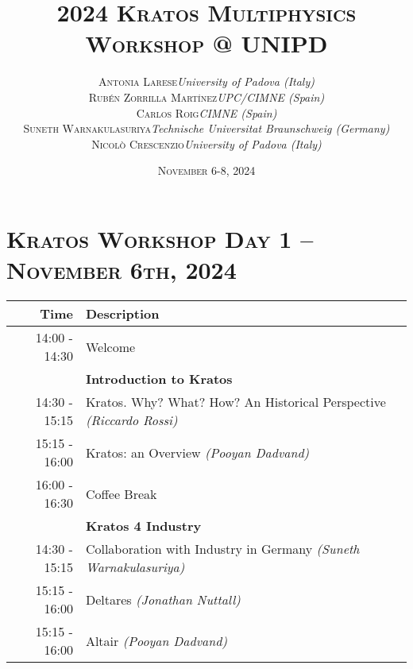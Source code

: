 \documentclass{article}
\begin{document}
\title{
   \Huge
   2024 \textsc{Kratos Multiphysics\\Workshop @ UNIPD}
}
\author{
   \small
   \begin{tabular}{rl}
      \textsc{Antonia Larese} & \textit{University of Padova (Italy)} \\
      \textsc{Rubén Zorrilla Martínez} & \textit{UPC/CIMNE (Spain)} \\
      \textsc{Carlos Roig} & \textit{CIMNE (Spain)} \\
      \textsc{Suneth Warnakulasuriya} & \textit{Technische Universitat Braunschweig (Germany)} \\
      \textsc{Nicol\`o Crescenzio} & \textit{University of Padova (Italy)}
   \end{tabular}
}
\date{\textsc{November} 6-8, 2024}
\maketitle

\section*{\centering\textsc{Kratos Workshop Day 1 -- November 6th, 2024}}

\begin{table}[h]\centering
   \begin{tabularx}{0.85\textwidth}{r|X}
      \toprule\rule{0mm}{5mm}
      {\large Time} & {\large Description} \\[1ex]
      \midrule\rule{0mm}{5mm}
      14:00 - 14:30 & Welcome \\[1ex]
      \midrule\rule{0mm}{5mm}
                    & {\large \textbf{Introduction to Kratos}} \\[1ex]
      14:30 - 15:15 & Kratos. Why? What? How? An Historical Perspective \textit{(Riccardo Rossi)}\\[1ex]
      15:15 - 16:00 & Kratos: an Overview \textit{(Pooyan Dadvand)}\\[1ex]
      \midrule\rule{0mm}{5mm}
      16:00 - 16:30 & Coffee Break \\[1ex]
      \midrule\rule{0mm}{5mm}
                    & {\large \textbf{Kratos 4 Industry}} \\[1ex]
      14:30 - 15:15 & Collaboration with Industry in Germany \textit{(Suneth Warnakulasuriya)}\\[1ex]
      15:15 - 16:00 & Deltares \textit{(Jonathan Nuttall)}\\[1ex]
      15:15 - 16:00 & Altair \textit{(Pooyan Dadvand)}\\[1ex]
      \bottomrule
   \end{tabularx}
\end{table}
\end{document}
